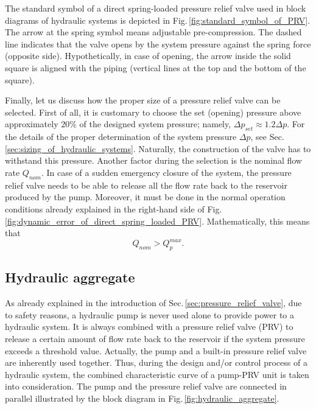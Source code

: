 The standard symbol of a direct spring-loaded pressure relief valve used in block diagrams of hydraulic systems is depicted in Fig.\,\ref{fig:standard_symbol_of_PRV}. The arrow at the spring symbol means adjustable pre-compression. The dashed line indicates that the valve opens by the system pressure against the spring force (opposite side). Hypothetically, in case of opening, the arrow inside the solid square is aligned with the piping (vertical lines at the top and the bottom of the square).

Finally, let us discuss how the proper size of a pressure relief valve can be selected. First of all, it is customary to choose the set (opening) pressure above approximately $20\%$ of the designed system pressure; namely, $\Delta p_{set} \approx 1.2 \Delta p$. For the details of the proper determination of the system pressure $\Delta p$, see Sec.\,\ref{sec:sizing_of_hydraulic_systems}. Naturally, the construction of the valve has to withstand this pressure. Another factor during the selection is the nominal flow rate $Q_{nom}$. In case of a sudden emergency closure of the system, the pressure relief valve needs to be able to release all the flow rate back to the reservoir produced by the pump. Moreover, it must be done in the normal operation conditions already explained in the right-hand side of Fig.\,\ref{fig:dynamic_error_of_direct_spring_loaded_PRV}. Mathematically, this means that
%
\begin{equation}
Q_{nom} > Q_{p}^{max}.
\end{equation}

\subsection{Hydraulic aggregate}
As already explained in the introduction of Sec.\,\ref{sec:pressure_relief_valve}, due to safety reasons, a hydraulic pump is never used alone to provide power to a hydraulic system. It is always combined with a pressure relief valve (PRV) to release a certain amount of flow rate back to the reservoir if the system pressure exceeds a threshold value. Actually, the pump and a built-in pressure relief valve are inherently used together. Thus, during the design and/or control process of a hydraulic system, the combined characteristic curve of a pump-PRV unit is taken into consideration. The pump and the pressure relief valve are connected in parallel illustrated by the block diagram in Fig.\,\ref{fig:hydraulic_aggregate}.

